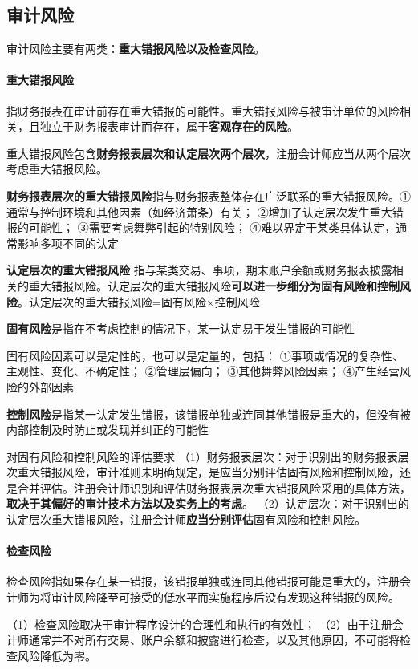 \documentclass[UTF8,12pt]{ctexart}
\numberwithin{equation}{section} %
\numberwithin{figure}{section}
\numberwithin{table}{section}
\begin{document}
	\subsection{审计风险}
	审计风险主要有两类：\textbf{重大错报风险以及检查风险}。
	\paragraph{重大错报风险}
	指财务报表在审计前存在重大错报的可能性。重大错报风险与被审计单位的风险相关，且独立于财务报表审计而存在，属于\textbf{客观存在的风险}。
	
	重大错报风险包含\textbf{财务报表层次和认定层次两个层次}，注册会计师应当从两个层次考虑重大错报风险。
	
	\textbf{财务报表层次的重大错报风险}指与财务报表整体存在广泛联系的重大错报风险。①通常与控制环境和其他因素（如经济萧条）有关；
	②增加了认定层次发生重大错报的可能性；
	③需要考虑舞弊引起的特别风险；
	④难以界定于某类具体认定，通常影响多项不同的认定
	
	\textbf{认定层次的重大错报风险}
	指与某类交易、事项，期末账户余额或财务报表披露相关的重大错报风险。认定层次的重大错报风险\textbf{可以进一步细分为固有风险和控制风险}。认定层次的重大错报风险=固有风险×控制风险
	
	\textbf{固有风险}是指在不考虑控制的情况下，某一认定易于发生错报的可能性
	
	固有风险因素可以是定性的，也可以是定量的，包括：
	①事项或情况的复杂性、主观性、变化、不确定性；
	②管理层偏向；
	③其他舞弊风险因素；
	④产生经营风险的外部因素
	
	\textbf{控制风险}是指某一认定发生错报，该错报单独或连同其他错报是重大的，但没有被内部控制及时防止或发现并纠正的可能性
	
	
	对固有风险和控制风险的评估要求
	（1）财务报表层次：对于识别出的财务报表层次重大错报风险，审计准则未明确规定，是应当分别评估固有风险和控制风险，还是合并评估。注册会计师识别和评估财务报表层次重大错报风险采用的具体方法，\textbf{取决于其偏好的审计技术方法以及实务上的考虑}。
	（2）认定层次：对于识别出的认定层次重大错报风险，注册会计师\textbf{应当分别评估}固有风险和控制风险。
	
	\paragraph{检查风险}
	检查风险指如果存在某一错报，该错报单独或连同其他错报可能是重大的，注册会计师为将审计风险降至可接受的低水平而实施程序后没有发现这种错报的风险。
	
	
	（1）检查风险取决于审计程序设计的合理性和执行的有效性；
	（2）由于注册会计师通常并不对所有交易、账户余额和披露进行检查，以及其他原因，不可能将检查风险降低为零。
	
\end{document}

